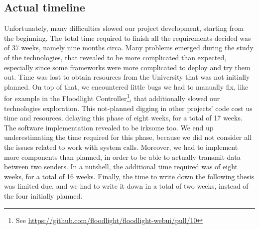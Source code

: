 \subsection{Actual timeline}
Unfortunately, many difficulties slowed our project development, starting from
the beginning. The total time required to finish all the requirements decided
was of 37 weeks, namely nine months circa. Many problems emerged during the
study of the technologies, that revealed to be more complicated than expected,
especially since some frameworks were more complicated to deploy and try them
out. Time was lost to obtain resources from the University that was not
initially planned. On top of that, we encountered little bugs we had to manually
fix, like for example in the Floodlight Controller\footnote{See
  \url{https://github.com/floodlight/floodlight-webui/pull/10}}, that
additionally slowed our technologies exploration. This not-planned digging in
other projects' code cost us time and resources, delaying this phase of eight
weeks, for a total of 17 weeks. The software implementation revealed to be
irksome too. We end up underestimating the time required for this phase, because
we did not consider all the issues related to work with system calls. Moreover,
we had to implement more components than planned, in order to be able to
actually transmit data between two senders. In a nutshell, the additional time
required was of eight weeks, for a total of 16 weeks. Finally, the time to write
down the following thesis was limited due, and we had to write it down in a
total of two weeks, instead of the four initially planned.
